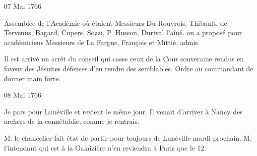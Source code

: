                     \begin{diary}{07 Mai 1766}{}

                         Assemblée de l'Académie où étaient Messieurs
                           Du Rouvrois, Thibault, de
                              Tervenus, Bagard,
                           Cupers, Sozzi, P. Husson,
                              Durival l'aîné.
                           on a proposé pour académiciens Messieurs
                           de La
                              Fargue, François et Mittié,
                           admis. \bigskip


                         Il est arrivé un arrêt du conseil qui casse
                           ceux de la Cour souveraine rendus en faveur des
                              Jésuites
                           défenses d'en rendre des semblables. Ordre au
                           commandant de donner main forte. \bigskip


                     \end{diary}

                     \begin{diary}{08 Mai 1766}{}

                         Je pars pour Lunéville et revient le même
                           jour. Il venait d'arriver à Nancy des
                           archers de la connétablie,
                           comme je rentrais. \bigskip



                           M. le chancelier fait état de partir pour toujours
                           de Lunéville mardi
                           prochain. M. l'intendant
                           qui est à la
                              Galaizière n'en reviendra à
                           Paris que le 12. \bigskip


                     \end{diary}

